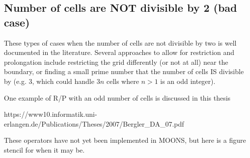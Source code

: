 \documentclass[11pt]{article}
\newcommand{\height}{0.4}
\newcommand{\radius}{0.1}
\newcommand{\dx}{1}
\newcommand{\dxc}{\dx*2}
\newcommand{\w}{1}
\begin{document}
\begin{figure}[h!]
  \begin{center}
    \caption*{}
  \end{center}
\end{figure}

\subsection{Number of cells are NOT divisible by 2 (bad case)}
These types of cases when the number of cells are not divisible by two is well documented in the literature. Several approaches to allow for restriction and prolongation include restricting the grid differently (or not at all) near the boundary, or finding a small prime number that the number of cells IS divisible by (e.g. 3, which could handle $3n$ cells where $n>1$ is an odd integer). 

One example of R/P with an odd number of cells is discussed in this thesis

https://www10.informatik.uni-erlangen.de/Publications/Theses/2007/Bergler\_DA\_07.pdf

These operators have not yet been implemented in MOONS, but here is a figure stencil for when it may be.
\end{document}
